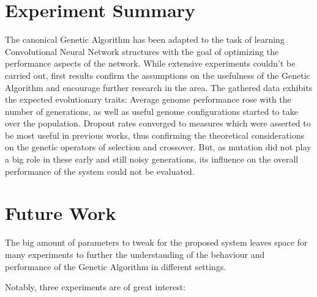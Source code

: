 \documentclass[11pt,a4paper,twoside,openright]{scrbook}
\begin{document}
\section{Experiment Summary}
The canonical Genetic Algorithm has been adapted to the task of learning Convolutional Neural Network structures with the goal of optimizing the performance aspects of the network. While extensive experiments couldn't be carried out, first results confirm the assumptions on the usefulness of the Genetic Algorithm and encourage further research in the area. The gathered data exhibits the expected evolutionary traits: Average genome performance rose with the number of generations, as well as useful genome configurations started to take over the population. Dropout rates converged to measures which were asserted to be most useful in previous works, thus confirming the theoretical considerations on the genetic operators of selection and crossover. But, as mutation did not play a big role in these early and still noisy generations, its influence on the overall performance of the system could not be evaluated.
\section{Future Work}
\label{chapter:futurework}
The big amount of parameters to tweak for the proposed system leaves space for many experiments to further the understanding of the behaviour and performance of the Genetic Algorithm in different settings.

Notably, three experiments are of great interest:
\end{document}

